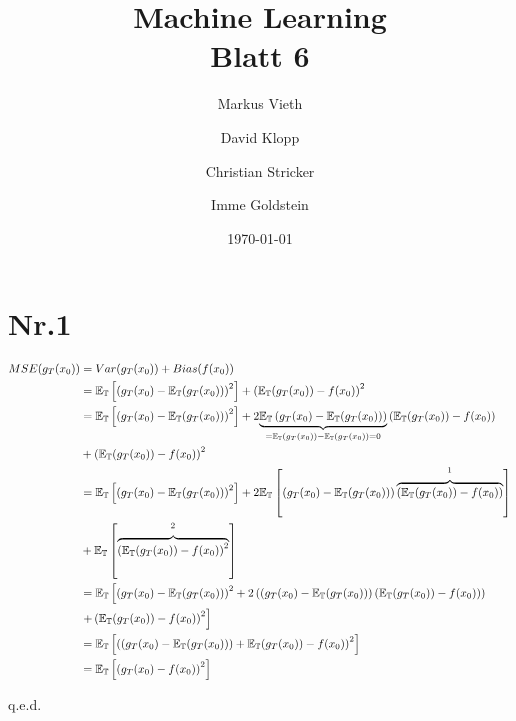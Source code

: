 \documentclass[a4paper,11pt,twoside]{scrartcl}
\title{Machine Learning\\ Blatt 6}
\author{Markus Vieth\and David Klopp\and Christian Stricker \and Imme Goldstein}
\date{\today}
\begin{document}
\newcommand{\cor}[1]{\textcolor{red}{\textit{#1}}}
\maketitle
\cleardoublepage
\pagestyle{myheadings}

\newpage

\section*{Nr.1}
\begin{align*}
 MSE( g_T(x_0) ) &= Var(g_T(x_0)) + Bias(f(x_0)) \\
 &= \mathbb{E_T}\left[ \left( g_T(x_0) - \mathbb{E_T}( g_T(x_0) ) \right)^2 \right] + \left( \mathbb{E_T}(g_T(x_0)) - f(x_0) \right)^2\\
 &= \mathbb{E_T}\left[ \left( g_T(x_0) - \mathbb{E_T}( g_T(x_0) ) \right)^2 \right] + 2\underset{=\mathbb{E_T}(g_T(x_0)) - \mathbb{E_T}(g_T(x_0)) = 0}{\underbrace{\mathbb{E_T}\left( g_T(x_0) - \mathbb{E_T}(g_T(x_0)) \right)}}\left( \mathbb{E_T}(g_T(x_0)) - f(x_0) \right) \\
 &+ \left( \mathbb{E_T}(g_T(x_0)) - f(x_0) \right)^2\\
 &= \mathbb{E_T}\left[ \left( g_T(x_0) - \mathbb{E_T}( g_T(x_0) ) \right)^2 \right] + 2\mathbb{E_T}\left[\left( g_T(x_0) - \mathbb{E_T}(g_T(x_0)) \right)\overset{\footnotemark}{\overbrace{\left( \mathbb{E_T}(g_T(x_0)) - f(x_0) \right)}}\right] \\
 &+ \mathbb{E_T}\left[\overset{\footnotemark}{\overbrace{\left( \mathbb{E_T}(g_T(x_0)) - f(x_0) \right)^2}}\right]\\ 
  &= \mathbb{E_T}\left[ \left( g_T(x_0) - \mathbb{E_T}( g_T(x_0) ) \right)^2  + 2\left(\left( g_T(x_0) - \mathbb{E_T}(g_T(x_0)) \right)\left( \mathbb{E_T}(g_T(x_0)) - f(x_0) \right)\right)\right . \\
  &\left .+ \left( \mathbb{E_T}(g_T(x_0)) - f(x_0) \right)^2\right]\\
  &= \mathbb{E_T}\left[ \left(\left( g_T(x_0) - \mathbb{E_T}( g_T(x_0) ) \right) + \mathbb{E_T}(g_T(x_0)) - f(x_0)\right)^2 \right]\\
  &= \mathbb{E_T}\left[ \left( g_T(x_0) - f(x_0) \right)^2 \right]
\end{align*}
\begin{flushright}
	q.e.d.
\end{flushright}
\addtocounter{footnote}{-1}
\end{document}
